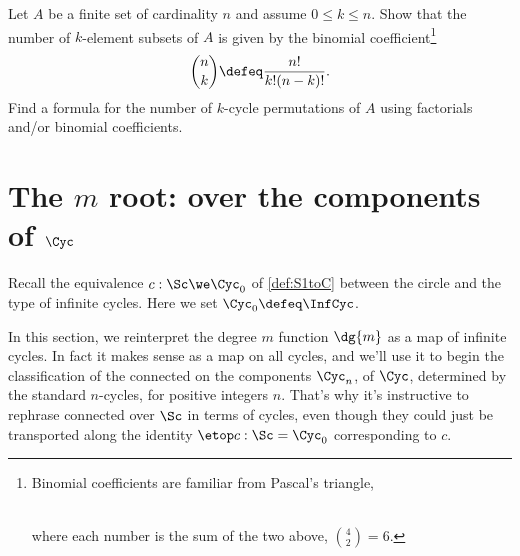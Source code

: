 \begin{xca}
  Let $A$ be a finite set of cardinality $n$ and assume $0\le k \le n$.
  Show that the number of $k$-element subsets of $A$ is given by the
  binomial coefficient\footnote{%
    Binomial coefficients are familiar from Pascal's triangle,\\
    \\
    \noindent where each number is the sum of the two above, \eg $\binom42 = 6$.}
  \[
    \binom nk \defeq \frac{n!}{k!(n-k)!}.
  \]
  Find a formula for the number of $k$-cycle permutations of $A$
  using factorials and/or binomial coefficients.
\end{xca}

\section{The \texorpdfstring{$m$\th}{mᵗʰ} root:
  \coverings over the components of $\Cyc$}

Recall the equivalence $c : \Sc \we \Cyc_0$ of \cref{def:S1toC}
between the circle and the type of infinite cycles.
Here we set $\Cyc_0 \defeq \InfCyc$.

In this section, we reinterpret the degree $m$ function $\dg{m}$
as a map of infinite cycles. In fact it makes sense as a map on all cycles,
and we'll use it to begin the classification
of the connected \coverings on the components $\Cyc_n$,
of $\Cyc$, determined by the standard $n$-cycles, for positive integers $n$.
That's why it's instructive to rephrase connected \coverings over $\Sc$
in terms of cycles,
even though they could just be transported along the identity $\etop c:\Sc=\Cyc_0$ corresponding to $c$.

